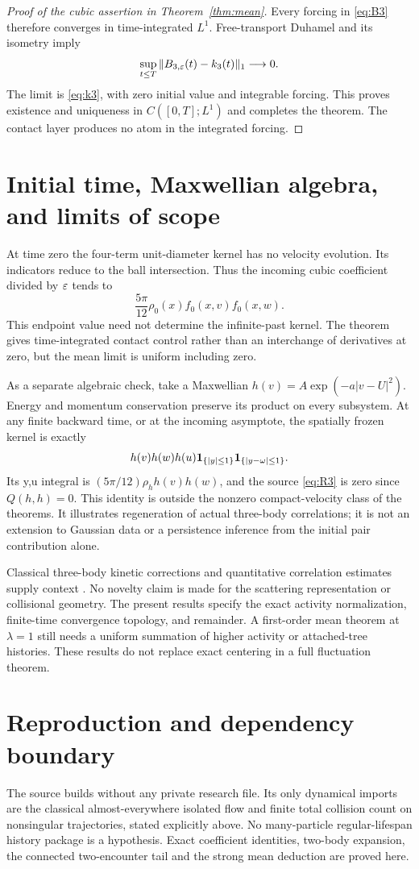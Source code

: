 \documentclass[11pt,letterpaper]{article}
\theoremstyle{remark}\newtheorem{remark}[theorem]{Remark}
\numberwithin{equation}{section}
\begin{document}
\begin{proof}[Proof of the cubic assertion in Theorem~\ref{thm:mean}]
Every forcing in \eqref{eq:B3} therefore converges in time-integrated $L^1$. Free-transport Duhamel and its isometry imply
\[
 \sup_{t\le T}\|B_{3,\varepsilon}(t)-k_3(t)\|_1\longrightarrow0.
\]
The limit is \eqref{eq:k3}, with zero initial value and integrable forcing. This proves existence and uniqueness in $C([0,T];L^1)$ and completes the theorem. The contact layer produces no atom in the integrated forcing.
\end{proof}

\section{Initial time, Maxwellian algebra, and limits of scope}
At time zero the four-term unit-diameter kernel has no velocity evolution. Its indicators reduce to the ball intersection. Thus the incoming cubic coefficient divided by $\varepsilon$ tends to
\[
 \frac{5\pi}{12}\rho_0(x)f_0(x,v)f_0(x,w).
\]
This endpoint value need not determine the infinite-past kernel. The theorem gives time-integrated contact control rather than an interchange of derivatives at zero, but the mean limit is uniform including zero.

As a separate algebraic check, take a Maxwellian $h(v)=A\exp(-a|v-U|^2)$. Energy and momentum conservation preserve its product on every subsystem. At any finite backward time, or at the incoming asymptote, the spatially frozen kernel is exactly
\[
 h(v)h(w)h(u)\mathbf1_{\{|y|\le1\}}\mathbf1_{\{|y-\omega|\le1\}}.
\]
Its y,u integral is $(5\pi/12)\rho_hh(v)h(w)$, and the source \eqref{eq:R3} is zero since $Q(h,h)=0$. This identity is outside the nonzero compact-velocity class of the theorems. It illustrates regeneration of actual three-body correlations; it is not an extension to Gaussian data or a persistence inference from the initial pair contribution alone.

Classical three-body kinetic corrections and quantitative correlation estimates supply context \cite{BE,PS}. No novelty claim is made for the scattering representation or collisional geometry. The present results specify the exact activity normalization, finite-time convergence topology, and remainder. A first-order mean theorem at $\lambda=1$ still needs a uniform summation of higher activity or attached-tree histories. These results do not replace exact centering in a full fluctuation theorem.

\appendix
\section{Reproduction and dependency boundary}
The source builds without any private research file. Its only dynamical imports are the classical almost-everywhere isolated flow and finite total collision count on nonsingular trajectories, stated explicitly above. No many-particle regular-lifespan history package is a hypothesis. Exact coefficient identities, two-body expansion, the connected two-encounter tail and the strong mean deduction are proved here.
\end{document}
